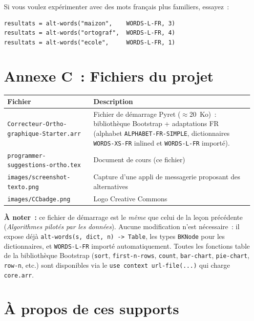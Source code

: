 \documentclass[12pt,a4paper]{article}
\begin{document}
Si vous voulez expérimenter avec des mots français plus familiers, essayez~:
\begin{lstlisting}
resultats = alt-words("maizon",    WORDS-L-FR, 3)
resultats = alt-words("ortograf",  WORDS-L-FR, 4)
resultats = alt-words("ecole",     WORDS-L-FR, 1)
\end{lstlisting}

\section*{Annexe C~: Fichiers du projet}

\begin{center}
\begin{tabularx}{\textwidth}{l X}
  \toprule
  \textbf{Fichier} & \textbf{Description} \\
  \midrule
  \texttt{Correcteur-Ortho}\allowbreak\texttt{-graphique-Starter.arr} & Fichier de démarrage Pyret ($\approx$20~Ko)~: bibliothèque Bootstrap + adaptations FR (alphabet \texttt{ALPHABET-FR-SIMPLE}, dictionnaires \texttt{WORDS-XS-FR} inlined et \texttt{WORDS-L-FR} importé). \\
  \texttt{programmer-suggestions-ortho.tex} & Document de cours (ce fichier) \\
  \texttt{images/screenshot-texto.png} & Capture d'une appli de messagerie proposant des alternatives \\
  \texttt{images/CCbadge.png} & Logo Creative Commons \\
  \bottomrule
\end{tabularx}
\end{center}

\vspace{1em}
\textbf{À noter~:} ce fichier de démarrage est le \emph{même} que celui de la leçon précédente (\emph{Algorithmes pilotés par les données}). Aucune modification n'est nécessaire~: il expose déjà \texttt{alt\allowbreak-words(s, dict, n) -> Table}, les types \texttt{BKNode} pour les dictionnaires, et \texttt{WORDS\allowbreak-L\allowbreak-FR} importé automatiquement. Toutes les fonctions table de la bibliothèque Bootstrap (\texttt{sort}, \texttt{first\allowbreak-n\allowbreak-rows}, \texttt{count}, \texttt{bar\allowbreak-chart}, \texttt{pie\allowbreak-chart}, \texttt{row\allowbreak-n}, etc.) sont disponibles via le \texttt{use context url\allowbreak-file(...)} qui charge \texttt{core.arr}.

\section*{À propos de ces supports}
\end{document}
